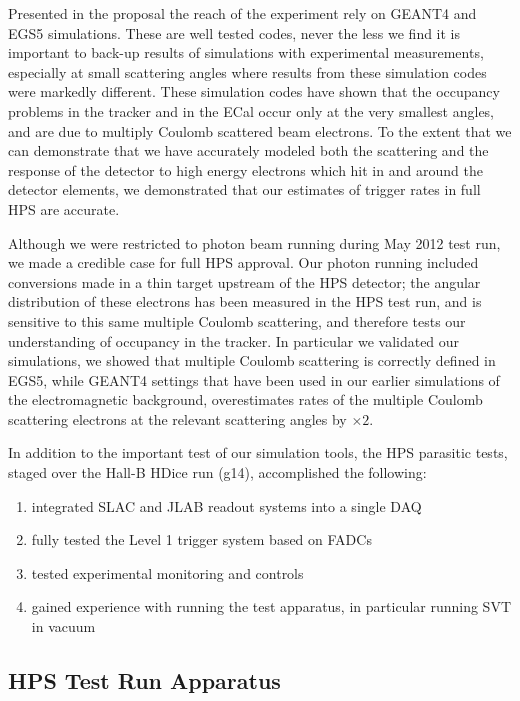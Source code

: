 Presented in the proposal the reach of the experiment rely on GEANT4 and EGS5 simulations. These are well tested codes, never the less we find it is important to back-up results of simulations with experimental measurements, especially at small scattering angles where results from these simulation codes were markedly different. These simulation codes have shown that the occupancy problems in the tracker and in the ECal occur only at the very smallest angles, and are due to multiply Coulomb scattered beam electrons. To the extent that we can demonstrate that we have accurately modeled both the scattering and the response of the detector to high energy electrons which hit in and around the detector elements, we demonstrated that our estimates of trigger rates in full HPS are accurate. 

Although we were restricted to photon beam running during May 2012 test run, we made a credible case for full HPS approval. Our photon running included conversions made in a thin target upstream of the HPS detector; the angular distribution of these electrons has been measured in the HPS test run, and is sensitive to this same multiple Coulomb scattering, and therefore  tests our understanding of occupancy in the tracker. In particular we validated our simulations, we showed that multiple Coulomb scattering is correctly defined in EGS5, while GEANT4 settings that have been used in our earlier simulations of the electromagnetic background, overestimates rates of the multiple Coulomb scattering electrons at the relevant scattering angles by $\times 2$. 

In addition to the important test of our simulation tools, the HPS parasitic tests, staged over the Hall-B HDice run (g14), accomplished the following: 
\begin{enumerate}
\item  integrated SLAC and JLAB readout systems into a single DAQ
\item fully tested the Level 1 trigger system based on FADCs
\item tested experimental monitoring and controls
\item gained experience with running the test apparatus, in particular running SVT in vacuum
\end{enumerate}

\subsection{HPS Test Run Apparatus } 

